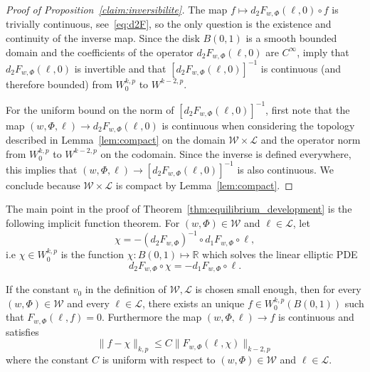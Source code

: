 \documentclass[AHL,Unicode,longabstracts,published]{cedram}
\newcommand{\R}{\mathbb{R}}
\newcommand{\clL}{\mathcal{L}}
\newcommand{\clW}{\mathcal{W}}
\newcommand{\norm}[1]{\lVert #1 \rVert}
\begin{document}
\begin{proof}[Proof of Proposition~\ref{claim:inversibilite}]
The map $f\mapsto d_2 F_{w,\Phi}(\ell,0)\circ f$ is trivially continuous, see~\eqref{eq:d2F}, so the only question is the existence and continuity of the inverse map. Since the disk $B(0,1)$ is a smooth bounded domain and the coefficients of the operator $d_2 F_{w,\Phi}(\ell,0)$ are $C^\infty$, \cite[Th.~11.3.2 and Th.~9.2.3]{krilov} imply that $d_2 F_{w,\Phi}(\ell, 0)$ is invertible and that $[d_2 F_{w,\Phi}(\ell,0)]^{-1}$ is continuous (and therefore bounded) from $W^{k,p}_0$ to $W^{k-2, p}$.

For the uniform bound on the norm of $[d_2 F_{w,\Phi}(\ell,0)]^{-1}$, first note that the map $(w, \Phi,\ell) \to d_2 F_{w,\Phi}(\ell, 0)$ is continuous when considering the topology described in Lemma~\ref{lem:compact} on the domain $\clW\times\clL$ and the operator norm from $W^{k, p}_0 $ to $W^{k-2,p}$ on the codomain. Since the inverse is defined everywhere, this implies that $(w, \Phi, \ell) \to [d_2F _{w,\Phi}(\ell, 0)]^{-1}$ is also continuous. We conclude because $\clW \times \clL $ is compact by Lemma~\ref{lem:compact}.
\end{proof}



The main point in the proof of Theorem~\ref{thm:equilibrium_development} is the following implicit function theorem. For $(w, \Phi) \in \clW$ and $\ell \in \clL$, let
\begin{equation}\label{eq:chichi}
\chi = -(d_2F_{w, \Phi})^{-1} \circ d_1 F_{w, \Phi} \circ \ell,
\end{equation}
i.e $\chi\in W^{k,p}_0$ is the function $\chi:B(0,1)\mapsto \R$ which solves the linear elliptic PDE
\begin{equation}\label{eq:chichi2}
d_2 F_{w, \Phi}\circ \chi = - d_1 F_{w, \Phi}\circ \ell.
\end{equation}
\begin{prop}\label{prop:analysefonct}
If the constant $v_0$ in the definition of $\clW,\clL$ is chosen small enough, then for every $(w, \Phi) \in \clW$ and every $\ell \in \clL$, there exists an unique $f\in W^{k,p}_0(B(0,1))$ such that $F_{w, \Phi}(\ell, f)=0$. Furthermore the map $(w, \Phi, \ell) \to f$ is continuous and satisfies
\begin{equation}\label{eq:implicit}
\norm{f -\chi}_{{k, p}} \leq C \norm{F_{w,\Phi}(\ell, \chi)}_{{k-2, p}}
\end{equation}
where the constant $C$ is uniform with respect to $(w, \Phi)\in\clW$ and $\ell\in\clL$.
\end{prop}
\end{document}
